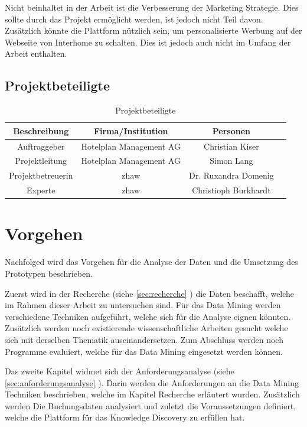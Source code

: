 Nicht beinhaltet in der Arbeit ist die Verbesserung der Marketing Strategie. Dies sollte durch das Projekt ermöglicht werden, ist jedoch nicht Teil davon. Zusätzlich könnte die Plattform nützlich sein, um personalisierte Werbung auf der Webseite von Interhome zu schalten. Dies ist jedoch auch nicht im Umfang der Arbeit enthalten.

\subsection{Projektbeteiligte}
\begin{table}[H] 
	\caption{Projektbeteiligte}
	\centering
	
	\begin{tabular}{ | c | c | c | c |} 
		\hline 
		\rowcolor{tableheadcolor}
		\bfseries Beschreibung & 
		\bfseries Firma/Institution & 
		\bfseries Personen \\ \hline 
		Auftraggeber & Hotelplan Management AG & Christian Kiser \\ \hline 
		Projektleitung & Hotelplan Management AG & Simon Lang\\ \hline 
		Projektbetreuerin &  \gls{zhaw} & Dr. Ruxandra Domenig \\ \hline 
		Experte & \gls{zhaw} & Christioph Burkhardt \\ \hline 
	\end{tabular} 
\end{table}

\section{Vorgehen}
\label{sec:einletung:vorgehen}
Nachfolged wird das Vorgehen für die Analyse der Daten und die Umsetzung des Prototypen beschrieben.

Zuerst wird in der Recherche (siehe \cref{sec:recherche} ) die Daten beschafft, welche im Rahmen dieser Arbeit zu untersuchen sind. Für das Data Mining werden verschiedene Techniken aufgeführt, welche sich für die Analyse eignen könnten. Zusätzlich werden noch existierende wissenschaftliche Arbeiten gesucht welche sich mit derselben Thematik auseinandersetzen. Zum Abschluss werden noch Programme evaluiert, welche für das Data Mining eingesetzt werden können.

Das zweite Kapitel widmet sich der Anforderungsanalyse (siehe \cref{sec:anforderungsanalyse} ). Darin werden die Anforderungen an die Data Mining Techniken beschrieben, welche im Kapitel Recherche erläutert wurden. Zusätzlich werden Die Buchungsdaten analysiert und zuletzt die Voraussetzungen definiert, welche die Plattform für das Knowledge Discovery zu erfüllen hat.

